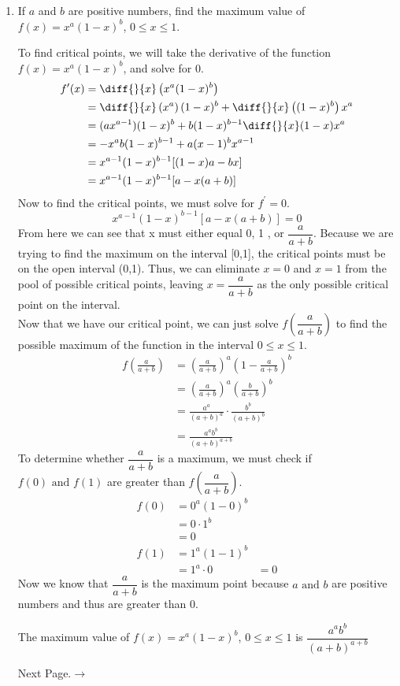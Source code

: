 \documentclass{article}
\begin{document}
\begin{enumerate}[label=\textbf{(13.\arabic*)}]

\item If $a$ and $b$ are positive numbers, find the maximum value of $f(x)=x^a(1-x)^b$, $0\le x\le 1$.

To find critical points, we will take the derivative of the function $f(x)=x^a(1-x)^b$, and solve for 0.
\begin{align*}
f^\prime(x)&=\diff{ }{x}\left(x^a(1-x)^b\right) \\
&=\diff{ }{x}\left(x^a\right)(1-x)^b+\diff{ }{x}\left((1-x)^b\right)x^a \\
&=(ax^{a-1})(1-x)^b+b(1-x)^{b-1}\diff{ }{x}(1-x)x^a \\
&=-x^ab(1-x)^{b-1}+a(x-1)^bx^{a-1} \\
&=x^{a-1}(1-x)^{b-1}[(1-x)a-bx] \\
&=x^{a-1}(1-x)^{b-1}[a-x(a+b)] \\
\end{align*}
Now to find the critical points, we must solve for $f^\prime=0$.
\[x^{a-1}(1-x)^{b-1}[a-x(a+b)]=0\]
From here we can see that x must either equal 0, 1 , or $\dfrac{a}{a+b}$. Because we are trying to find the maximum on the interval [0,1], the critical points must be on the open interval (0,1). Thus, we can eliminate $x=0$ and $x=1$ from the pool of possible critical points, leaving $x=\dfrac{a}{a+b}$ as the only possible critical point on the interval.\\
Now that we have our critical point, we can just solve $f(\dfrac{a}{a+b})$ to find the possible maximum of the function in the interval $0\le x\le 1$.
\begin{align*}
f\left(\frac{a}{a+b}\right)&={\left(\frac{a}{a+b}\right)}^a{\left(1-\frac{a}{a+b}\right)}^b \\
&={\left(\frac{a}{a+b}\right)}^a{\left(\frac{b}{a+b}\right)}^b \\
&= \frac{a^a}{{\left(a+b\right)}^a}\cdot\frac{b^b}{{\left(a+b\right)}^b} \\
&=\frac{a^ab^b}{{\left(a+b\right)}^{a+b}}
\end{align*}
To determine whether $\dfrac{a}{a+b}$ is a maximum, we must check if $f(0) \text{ and } f(1)$ are greater than $f\left(\dfrac{a}{a+b}\right)$.
\begin{align*}
f(0)&=0^a(1-0)^b \\
&=0\cdot1^b \\
&=0 \\
f(1)&=1^a(1-1)^b \\
&=1^a\cdot0
&=0
\end{align*}
Now we know that $\dfrac{a}{a+b}$ is the maximum point because $a \text{ and } b$ are positive numbers and thus are greater than 0.
\begin{tcolorbox}[colback=white]
The maximum value of  $f(x)=x^a(1-x)^b$, $0\le x\le 1$ is $\dfrac{a^ab^b}{{\left(a+b\right)}^{a+b}}$
\centering
\end{tcolorbox}

\par
Next Page.$ \rightarrow$


\end{enumerate}
\end{document}
